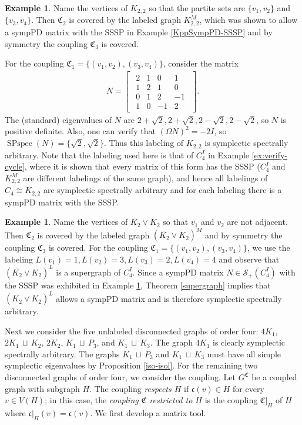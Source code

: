 \documentclass[12pt]{article}
\theoremstyle{definition}
\theoremstyle{definition}
\theoremstyle{definition}
\newtheorem{ex}[thm]{Example}
\numberwithin{figure}{section}
\numberwithin{equation}{section}
\newcommand{\GC}[2]{#1 ^ {\mathfrak #2}}
\newcommand{\PP}{\mathfrak{C}}
\newcommand{\pp}{\mathfrak{c}}
\newcommand{\symp}{\mathcal{S}_+}
\newcommand{\mtx}[1]{\begin{bmatrix} #1 \end{bmatrix}}
\newcommand{\spspec}{\operatorname{SPspec}}
\newcommand{\ms}{\medskip}
\newcommand{\OL}{\overline}
\newcommand{\du}{\mathbin{\,\sqcup\,}}
\begin{document}
\begin{ex}\label{K22cup2}
 Name the vertices of $K_{2,2}$ so that the partite sets are $\{v_1,v_2\}$ and  $\{v_3,v_4\}$. Then $\PP_2$ is covered by the labeled graph $K_{2,2}^M$, which was shown to allow a sympPD matrix {with the SSSP} in Example \ref{KppSympPD-SSSP} and by  symmetry the coupling $\PP_3$ is covered.   


For the coupling $\PP_1=\{(v_1,v_2),(v_3,v_4)\}$, consider the matrix
\begin{align}
\label{eq:PP2}
 N=
 \mtx{
 \begin{array}{rrrr}
2 & 1 & 0 & 1 \\
 1 & 2 & 1 & 0 \\
 0 & 1 & 2 & -1 \\
 1 & 0 & -1 & 2 
 \end{array}
 }.
\end{align} 
The (standard) eigenvalues of $N$ are $2+\sqrt 2, 2+\sqrt 2,2-\sqrt 2,2-\sqrt 2$, so  $N$ is positive definite.
Also, one can verify that $(\Omega N)^2=-2I$, so $\spspec(N)=\{\sqrt 2,\sqrt 2\}$.
  Thus this labeling of $K_{2,2}$ is symplectic spectrally arbitrary. Note that the labeling used here is that of $C_4^I$  in Example \ref{ex:verify-cycle}, where it is shown that every  matrix of this form  has the SSSP ($C_4^I$  and $K_{2,2}^M$ are  different labelings of the same graph),   and hence all labelings of $C_4\cong K_{2,2}$ are  symplectic spectrally arbitrary and for each labeling there is a sympPD matrix with the SSSP. 
\end{ex}

\begin{ex}\label{K4-ecup2}
Name the vertices of $\OL{K_2}\vee K_2$ so that  $v_1$ and $v_2$ are not adjacent.
 Then $\PP_2$ is covered by the labeled graph $(\OL{K_2}\vee K_2)^M$ and by  symmetry the coupling $\PP_3$ is covered.  
For the coupling $\PP_1=\{(v_1,v_2),(v_3,v_4)\}$, we use the labeling $L(v_1)=1, L(v_2)=3, L(v_3)=2, L(v_4)=4$ and observe that  $(\OL{K_2}\vee K_2)^L$ is a supergraph of $C_4^I$.  Since  a sympPD matrix $N\in\symp(C_4^I)$ with the SSSP was exhibited in Example \ref{K22cup2}, Theorem \ref{supergraph} implies that $(\OL{K_2}\vee K_2)^L$ allows a sympPD matrix and is therefore symplectic spectrally arbitrary.  \end{ex}
\ms


  Next we consider the five unlabeled disconnected graphs of order four: $4K_1$, $2K_1\du K_2$, $2K_2$, $K_1\du P_3$, and $K_1\du K_3$.
The graph $4K_1$ is  clearly symplectic spectrally arbitrary. The graphs $K_1\du P_3$ and $K_1\du K_3$ must have all simple symplectic eigenvalues by Proposition \ref{iso-isol}.
For the remaining two disconnected graphs of order four, we consider the coupling. Let $\GC G C$ be a coupled graph with subgraph $H$.   The coupling \emph{respects $H$} if $\pp(v)\in H$ for every $v\in V(H)$; in this case, the \emph{coupling $\PP$ restricted to $H$} is the coupling $\PP|_{H}$ of $H$ where $\pp|_{H}(v)=\pp(v)$.  We first develop a matrix tool.
\end{document}
